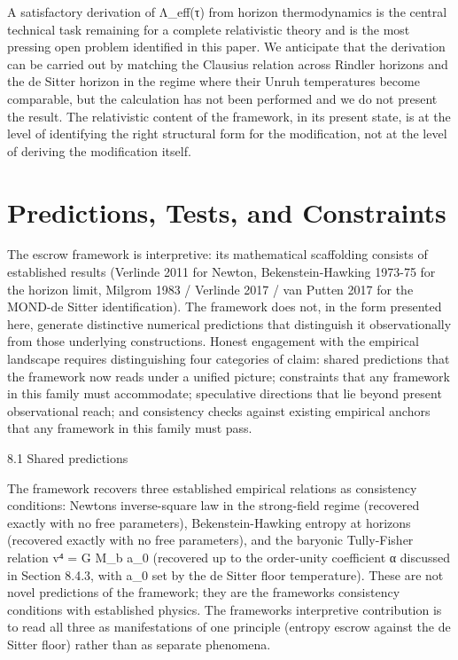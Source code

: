 \documentclass[11pt]{article}
\begin{document}
A satisfactory derivation of Λ\_eff(τ) from horizon thermodynamics is the central technical task remaining for a complete relativistic theory and is the most pressing open problem identified in this paper. We anticipate that the derivation can be carried out by matching the Clausius relation across Rindler horizons and the de Sitter horizon in the regime where their Unruh temperatures become comparable, but the calculation has not been performed and we do not present the result. The relativistic content of the framework, in its present state, is at the level of identifying the right structural form for the modification, not at the level of deriving the modification itself.

\section{Predictions, Tests, and Constraints}\label{predictions-tests-and-constraints}

The escrow framework is interpretive: its mathematical scaffolding consists of established results (Verlinde 2011 for Newton, Bekenstein-Hawking 1973-75 for the horizon limit, Milgrom 1983 / Verlinde 2017 / van Putten 2017 for the MOND-de Sitter identification). The framework does not, in the form presented here, generate distinctive numerical predictions that distinguish it observationally from those underlying constructions. Honest engagement with the empirical landscape requires distinguishing four categories of claim: shared predictions that the framework now reads under a unified picture; constraints that any framework in this family must accommodate; speculative directions that lie beyond present observational reach; and consistency checks against existing empirical anchors that any framework in this family must pass.

8.1 Shared predictions

The framework recovers three established empirical relations as consistency conditions: Newton\textquotesingle s inverse-square law in the strong-field regime (recovered exactly with no free parameters), Bekenstein-Hawking entropy at horizons (recovered exactly with no free parameters), and the baryonic Tully-Fisher relation v⁴ = G M\_b a\_0 (recovered up to the order-unity coefficient α discussed in Section 8.4.3, with a\_0 set by the de Sitter floor temperature). These are not novel predictions of the framework; they are the framework\textquotesingle s consistency conditions with established physics. The framework\textquotesingle s interpretive contribution is to read all three as manifestations of one principle (entropy escrow against the de Sitter floor) rather than as separate phenomena.
\end{document}
